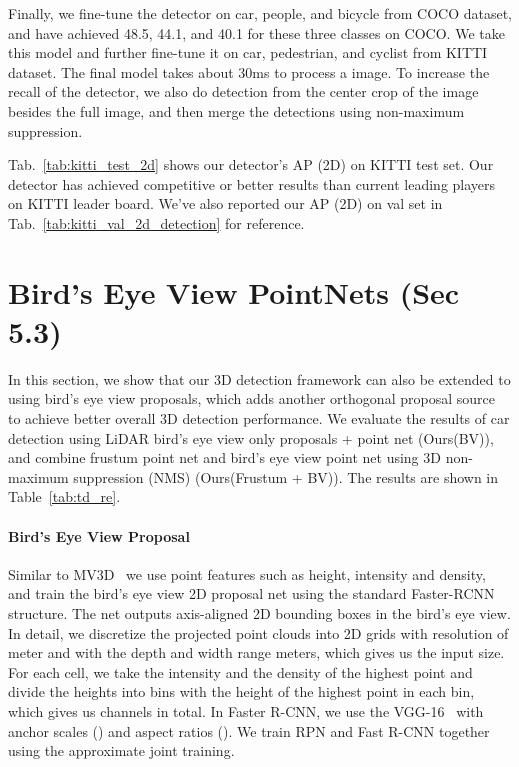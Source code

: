 \documentclass[10pt,twocolumn,letterpaper]{article}
\begin{document}
Finally, we fine-tune the detector on car, people, and bicycle from COCO dataset, and have achieved 48.5, 44.1, and 40.1 for these three classes on COCO. We take this model and further fine-tune it on car, pedestrian, and cyclist from KITTI dataset. The final model takes about 30ms to process a  image. To increase the recall of the detector, we also do detection from the center crop of the image besides the full image, and then merge the detections using non-maximum suppression.

Tab.~\ref{tab:kitti_test_2d} shows our detector's AP (2D) on KITTI test set. Our detector has achieved competitive or better results than current leading players on KITTI leader board. We've also reported our AP (2D) on val set in Tab.~\ref{tab:kitti_val_2d_detection} for reference.




\section{Bird's Eye View PointNets (Sec 5.3)}
\label{sec:supp_bv}

In this section, we show that our 3D detection framework can also be extended to using bird's eye view proposals, which adds another orthogonal proposal source to achieve better overall 3D detection performance. We evaluate the results of car detection using LiDAR bird's eye view only proposals + point net (Ours(BV)), and combine frustum point net and bird's eye view point net using 3D non-maximum suppression (NMS) (Ours(Frustum + BV)). The results are shown in Table~\ref{tab:td_re}.

\paragraph{Bird's Eye View Proposal} Similar to MV3D~\cite{cvpr17chen} we use point features such as height, intensity and density, and train the bird's eye view 2D proposal net using the standard Faster-RCNN~\cite{ren2015faster} structure. The net outputs axis-aligned 2D bounding boxes in the bird's eye view. In detail, we discretize the projected point clouds into 2D grids with resolution of  meter and with the depth and width range  meters, which gives us the  input size. For each cell, we take the intensity and the density of the highest point and divide the heights into  bins with the height of the highest point in each bin, which gives us  channels in total. In Faster R-CNN, we use the VGG-16~\cite{simonyan2014very} with  anchor scales () and  aspect ratios (). We train RPN and Fast R-CNN together using the approximate joint training.
\end{document}
